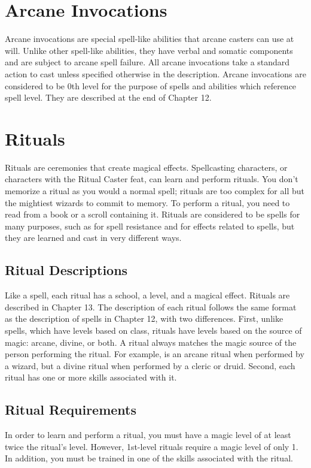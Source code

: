 \section{Arcane Invocations}
Arcane invocations are special spell-like abilities that arcane casters can use at will. Unlike other spell-like abilities, they have verbal and somatic components and are subject to arcane spell failure. All arcane invocations take a standard action to cast unless specified otherwise in the description. Arcane invocations are considered to be 0th level for the purpose of spells and abilities which reference spell level. They are described at the end of Chapter 12.

\section{Rituals}
Rituals are ceremonies that create magical effects. Spellcasting characters, or characters with the Ritual Caster feat, can learn and perform rituals. You don't memorize a ritual as you would a normal spell; rituals are too complex for all but the mightiest wizards to commit to memory. To perform a ritual, you need to read from a book or a scroll containing it. Rituals are considered to be spells for many purposes, such as for spell resistance and for effects related to spells, but they are learned and cast in very different ways.
\subsection{Ritual Descriptions}
\par Like a spell, each ritual has a school, a level, and a magical effect. Rituals are described in Chapter 13. The description of each ritual follows the same format as the description of spells in Chapter 12, with two differences. First, unlike spells, which have levels based on class, rituals have levels based on the source of magic: arcane, divine, or both. A ritual always matches the magic source of the person performing the ritual. For example,  is an arcane ritual when performed by a wizard, but a divine ritual when performed by a cleric or druid. Second, each ritual has one or more skills associated with it.
\subsection{Ritual Requirements} In order to learn and perform a ritual, you must have a magic level of at least twice the ritual's level. However, 1st-level rituals require a magic level of only 1. In addition, you must be trained in one of the skills associated with the ritual.
